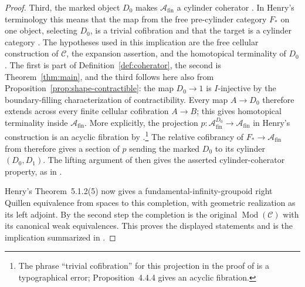 \documentclass[11pt,letterpaper]{article}
\numberwithin{equation}{section}
\theoremstyle{plain}
\theoremstyle{definition}
\theoremstyle{remark}
\begin{document}
\begin{proof}
Third, the marked object \(D_0\) makes
\(\mathcal A_{\mathrm{fin}}\) a cylinder coherator
\cite[Corollary~5.3.12]{Henry2016}.  In Henry's terminology this
means that the map from the free pre-cylinder category \(F_*\) on one object,
selecting \(D_0\), is a trivial cofibration and that the target is a
cylinder category \cite[Definition~5.1.1]{Henry2016}.
The hypotheses used in this implication are the
free cellular construction of \(\mathcal C\), the expansion
assertion, and the homotopical terminality of \(D_0\).  The first is
part of Definition~\ref{def:coherator}, the second is
Theorem~\ref{thm:main}, and the third follows here also from
Proposition~\ref{prop:shape-contractible}: the map \(D_0\to1\)
is \(I\)-injective by the boundary-filling characterization of
contractibility.  Every map \(A\to D_0\) therefore extends across
every finite cellular cofibration \(A\to B\); this gives
homotopical terminality inside \(\mathcal A_{\mathrm{fin}}\).
More explicitly, the projection
\(p:\mathcal A_{\mathrm{fin}}^{D_0}\to\mathcal A_{\mathrm{fin}}\)
in Henry's construction is an acyclic fibration by
\cite[Proposition~4.4.4]{Henry2016}.\footnote{The phrase
``trivial cofibration'' for this projection in the proof of
\cite[Lemma~5.3.11]{Henry2016} is a typographical error;
Proposition~4.4.4 gives an acyclic fibration.}
The relative cofibrancy of \(F_*\to\mathcal A_{\mathrm{fin}}\)
from \cite[Proposition~5.3.7]{Henry2016} therefore gives a section
of \(p\) sending the marked \(D_0\) to its cylinder \((D_0,D_1)\).
The lifting argument of \cite[Lemma~5.3.9]{Henry2016} then gives
the asserted cylinder-coherator property, as in
\cite[Lemma~5.3.11 and Corollary~5.3.12]{Henry2016}.

Henry's Theorem~5.1.2(5) now gives a fundamental-infinity-groupoid
right Quillen equivalence from spaces to this completion, with
geometric realization as its left adjoint.  By the second step the
completion is the original \(\operatorname{Mod}(\mathcal C)\) with its canonical
weak equivalences.  This proves the displayed statements and is the
implication summarized in \cite[Corollary~5.3.13]{Henry2016}.
\end{proof}



\end{document}
